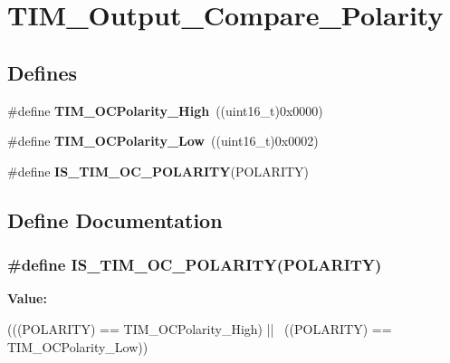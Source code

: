 \hypertarget{group__TIM__Output__Compare__Polarity}{
\section{TIM\_\-Output\_\-Compare\_\-Polarity}
\label{group__TIM__Output__Compare__Polarity}
}
\subsection*{Defines}
\begin{DoxyCompactItemize}
\item 
\hypertarget{group__TIM__Output__Compare__Polarity_gaba2f2de6fd722b8973e0eddeb8644022}{
\#define {\bfseries TIM\_\-OCPolarity\_\-High}~((uint16\_\-t)0x0000)}
\label{group__TIM__Output__Compare__Polarity_gaba2f2de6fd722b8973e0eddeb8644022}

\item 
\hypertarget{group__TIM__Output__Compare__Polarity_ga9f4b11953dbd2c6f836b6913469dcf54}{
\#define {\bfseries TIM\_\-OCPolarity\_\-Low}~((uint16\_\-t)0x0002)}
\label{group__TIM__Output__Compare__Polarity_ga9f4b11953dbd2c6f836b6913469dcf54}

\item 
\#define {\bfseries IS\_\-TIM\_\-OC\_\-POLARITY}(POLARITY)
\end{DoxyCompactItemize}


\subsection{Define Documentation}
\hypertarget{group__TIM__Output__Compare__Polarity_ga1c2ee68d587d4f48d935c82fe4c3fe1e}{
\subsubsection[{IS\_\-TIM\_\-OC\_\-POLARITY}]{\setlength{\rightskip}{0pt plus 5cm}\#define IS\_\-TIM\_\-OC\_\-POLARITY(POLARITY)}}
\label{group__TIM__Output__Compare__Polarity_ga1c2ee68d587d4f48d935c82fe4c3fe1e}
{\bfseries Value:}
\begin{DoxyCode}
(((POLARITY) == TIM_OCPolarity_High) || \
                                      ((POLARITY) == TIM_OCPolarity_Low))
\end{DoxyCode}
